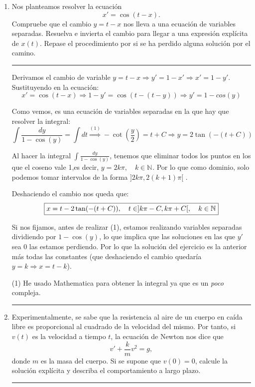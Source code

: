 \documentclass[12pt]{article}
\newcommand{\R}[1][]{\mathbb{R}^{#1}}
\newcommand{\N}[1][]{\mathbb{N}^{#1}}
\newcommand{\solution}[1]{\text{\fbox{$#1$}}}
\begin{document}
\begin{enumerate}
Para la segunda ecuación también aplicamos variables separadas, por lo que tendríamos que resolver la integral:
\[
\int\frac{dP}{P(\alpha-\beta \ln P)}=\int dt
\]
La primera integral se resuelve con el cambio de variable $u=\alpha - \beta \ln P \quad dx=-\frac{x}{\beta}du$, que nos da:
\[
\int\frac{dP}{P(\alpha-\beta \ln P)}=\int dt \Longrightarrow -\frac{\ln(|\beta\ln(P)-\alpha|)}{b}=t+C
\]

De donde no vamos a despejar $P$ por simplicidad, luego la solución, en implícitas, es:
\[
\solution{-\frac{\ln(|\beta\ln(P)-\alpha|)}{b}=t+C \quad C\in\R}
\]

\newpage
\hrule
\item Nos planteamos resolver la ecuación
\[
x'=\cos(t-x).
\]
Compruebe que el cambio $y=t-x$ nos lleva a una ecuación de variables separadas. Resuelva e invierta el cambio para llegar a una expresión explícita de $x(t)$. Repase el procedimiento por si se ha perdido alguna solución por el camino.\\
\hrule

Derivamos el cambio de variable $y=t-x \Longrightarrow y'=1-x' \Longrightarrow x'=1-y'$. Sustituyendo en la ecuación:
\[
x'=\cos(t-x) \Longrightarrow 1-y'=\cos(t-(t-y)) \Longrightarrow y'=1-cos(y)
\]

Como vemos, es una ecuación de variables separadas en la que hay que resolver la integral:
\[
\int \frac{dy}{1-\cos(y)}=\int dt \stackrel{(1)}{\Longrightarrow} -\cot(\frac{y}{2}) = t+C \Longrightarrow y=2\tan(-(t+C))
\]

Al hacer la integral $\displaystyle \int \frac{dy}{1-\cos(y)} $, tenemos que eliminar todos los puntos en los que el coseno vale 1,es decir, $y=2k\pi, \quad k\in\N$. Por lo que como dominio, solo podemos tomar intervalos de la forma $]2k\pi,2(k+1)\pi[$ .


Deshaciendo el cambio nos queda que:
\[
\solution{x=t-2\tan(-(t+C)), \quad t\in ]k\pi-C, k\pi+C[, \quad k\in\N}
\]

Si nos fijamos, antes de realizar (1), estamos realizando variables separadas dividiendo por $1-\cos(y)$, lo que implica que las soluciones en las que $y'$ sea 0 las estamos perdiendo. Por lo que la solución del ejercicio es la anterior más todas las constantes (que deshaciendo el cambio quedaría $y=k \Longrightarrow x=t-k$). 

(1) He usado Mathematica para obtener la integral ya que es un \textit{poco} compleja.


\newpage
\hrule
\item Experimentalmente, se sabe que la resistencia al aire de un cuerpo en caída libre es proporcional al cuadrado de la velocidad del mismo. Por tanto, si $v(t)$ es la velocidad a tiempo $t$, la ecuación de Newton nos dice que
\[
v'+\frac{k}{m}v^2=g,
\]
donde $m$ es la masa del cuerpo. Si se supone que $v(0)=0$, calcule la solución explícita y describa el comportamiento a largo plazo.
\hrule


\end{enumerate}
\end{document}
